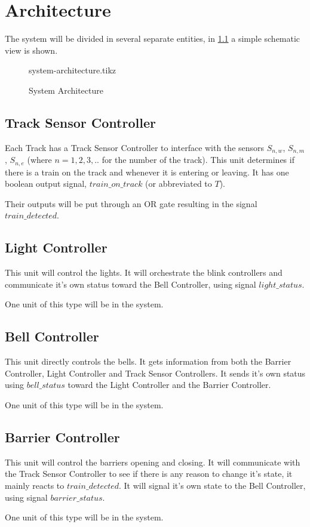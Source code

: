 \documentclass[final]{report}
\begin{document}
\chapter{Architecture}
The system will be divided in several separate entities, in \cref{fig:system-architecture} a simple schematic view is shown.

\begin{figure}[H]
	\centering
	{system-architecture.tikz}
	\caption{System Architecture}
	\label{fig:system-architecture}
\end{figure}

\section{Track Sensor Controller}
Each Track has a Track Sensor Controller to interface with the sensors $S_{n,w}$, $S_{n,m}$, $S_{n,e}$ (where $n = 1,2,3,..$ for the number of the track).
This unit determines if there is a train on the track and whenever it is entering or leaving.
It has one boolean output signal, $train\_on\_track$ (or abbreviated to $T$).

Their outputs will be put through an OR gate resulting in the signal $train\_detected$.

\section{Light Controller}
This unit will control the lights.
It will orchestrate the blink controllers and communicate it's own status toward the Bell Controller, using signal $light\_status$.

One unit of this type will be in the system.


\section{Bell Controller}
This unit directly controls the bells.
It gets information from both the Barrier Controller, Light Controller and Track Sensor Controllers.
It sends it's own status using $bell\_status$ toward the Light Controller and the Barrier Controller.

One unit of this type will be in the system.

\section{Barrier Controller}
This unit will control the barriers opening and closing.
It will communicate with the Track Sensor Controller to see if there is any reason to change it's state, it mainly reacts to $train\_detected$.
It will signal it's own state to the Bell Controller, using signal $barrier\_status$.

One unit of this type will be in the system.
\end{document}
